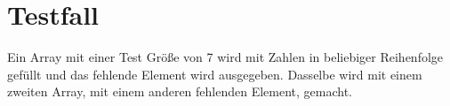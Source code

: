 \section*{Testfall}
Ein Array mit einer Test Größe von 7 wird mit Zahlen in beliebiger Reihenfolge gefüllt und das fehlende Element wird ausgegeben. Dasselbe wird mit einem zweiten Array, mit einem anderen fehlenden Element, gemacht.

\newpage